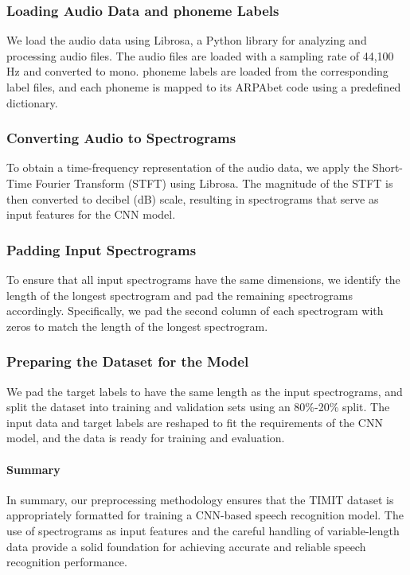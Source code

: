 \documentclass[12pt]{article}
\begin{document}
\subsubsection{Loading Audio Data and phoneme Labels}

We load the audio data using Librosa, a Python library for analyzing and processing audio files. The audio files are loaded with a sampling rate of 44,100 Hz and converted to mono. phoneme labels are loaded from the corresponding label files, and each phoneme is mapped to its ARPAbet code using a predefined dictionary.

\subsubsection{Converting Audio to Spectrograms}

To obtain a time-frequency representation of the audio data, we apply the Short-Time Fourier Transform (STFT) using Librosa. The magnitude of the STFT is then converted to decibel (dB) scale, resulting in spectrograms that serve as input features for the CNN model.

\subsubsection{Padding Input Spectrograms}

To ensure that all input spectrograms have the same dimensions, we identify the length of the longest spectrogram and pad the remaining spectrograms accordingly. Specifically, we pad the second column of each spectrogram with zeros to match the length of the longest spectrogram.

\subsubsection{Preparing the Dataset for the Model}

We pad the target labels to have the same length as the input spectrograms, and split the dataset into training and validation sets using an 80\%-20\% split. The input data and target labels are reshaped to fit the requirements of the CNN model, and the data is ready for training and evaluation.

\paragraph{Summary}

In summary, our preprocessing methodology ensures that the TIMIT dataset is appropriately formatted for training a CNN-based speech recognition model. The use of spectrograms as input features and the careful handling of variable-length data provide a solid foundation for achieving accurate and reliable speech recognition performance.
\end{document}
